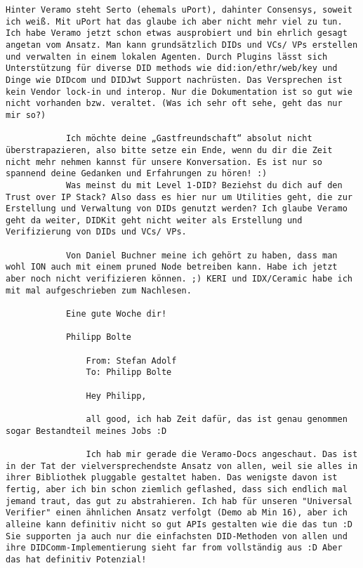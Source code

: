\begin{Verbatim}[breaklines=true, breaksymbol={}, breaksymbolsepleftnchars=2]
            Hinter Veramo steht Serto (ehemals uPort), dahinter Consensys, soweit ich weiß. Mit uPort hat das glaube ich aber nicht mehr viel zu tun. Ich habe Veramo jetzt schon etwas ausprobiert und bin ehrlich gesagt angetan vom Ansatz. Man kann grundsätzlich DIDs und VCs/ VPs erstellen und verwalten in einem lokalen Agenten. Durch Plugins lässt sich Unterstützung für diverse DID methods wie did:ion/ethr/web/key und Dinge wie DIDcom und DIDJwt Support nachrüsten. Das Versprechen ist kein Vendor lock-in und interop. Nur die Dokumentation ist so gut wie nicht vorhanden bzw. veraltet. (Was ich sehr oft sehe, geht das nur mir so?)
            
            Ich möchte deine „Gastfreundschaft“ absolut nicht überstrapazieren, also bitte setze ein Ende, wenn du dir die Zeit nicht mehr nehmen kannst für unsere Konversation. Es ist nur so spannend deine Gedanken und Erfahrungen zu hören! :)
            Was meinst du mit Level 1-DID? Beziehst du dich auf den Trust over IP Stack? Also dass es hier nur um Utilities geht, die zur Erstellung und Verwaltung von DIDs genutzt werden? Ich glaube Veramo geht da weiter, DIDKit geht nicht weiter als Erstellung und Verifizierung von DIDs und VCs/ VPs.
            
            Von Daniel Buchner meine ich gehört zu haben, dass man wohl ION auch mit einem pruned Node betreiben kann. Habe ich jetzt aber noch nicht verifizieren können. ;) KERI und IDX/Ceramic habe ich mit mal aufgeschrieben zum Nachlesen.
            
            Eine gute Woche dir!
            
            Philipp Bolte
            
                From: Stefan Adolf
                To: Philipp Bolte
                
                Hey Philipp,

                all good, ich hab Zeit dafür, das ist genau genommen sogar Bestandteil meines Jobs :D 
                
                Ich hab mir gerade die Veramo-Docs angeschaut. Das ist in der Tat der vielversprechendste Ansatz von allen, weil sie alles in ihrer Bibliothek pluggable gestaltet haben. Das wenigste davon ist fertig, aber ich bin schon ziemlich geflashed, dass sich endlich mal jemand traut, das gut zu abstrahieren. Ich hab für unseren "Universal Verifier" einen ähnlichen Ansatz verfolgt (Demo ab Min 16), aber ich alleine kann definitiv nicht so gut APIs gestalten wie die das tun :D Sie supporten ja auch nur die einfachsten DID-Methoden von allen und ihre DIDComm-Implementierung sieht far from vollständig aus :D Aber das hat definitiv Potenzial!
                

\end{Verbatim}
